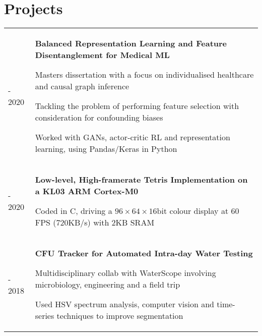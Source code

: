 \documentclass[letterpaper, 10pt]{article}
\begin{document}
\section*{Projects}
\begin{tabularx}{\linewidth}{>{\raggedleft}p{2.2cm}|p{6.45cm} X}
2019 - 2020 & \multicolumn{2}{p{\linegoal}}{
    \vspace{-2.9mm}\textbf{Balanced Representation Learning and Feature Disentanglement for Medical ML}
    \begin{compact}
        \item Masters dissertation with a focus on individualised healthcare and causal graph inference
        \item Tackling the problem of performing feature selection with consideration for confounding biases
        \item Worked with GANs, actor-critic RL and representation learning, using Pandas/Keras in Python
        \vspace{-.5\baselineskip}
    \end{compact}
}\\
2019 - 2020 & \multicolumn{2}{p{\linegoal}}{
\vspace{-2.9mm}\textbf{Low-level, High-framerate Tetris Implementation on a KL03 ARM Cortex-M0}
\begin{compact}
   \item Coded in C, driving a $96\times64\times16\mathrm{bit}$ colour display at 60 FPS (720KB/s) with 2KB SRAM
   \vspace{-.5\baselineskip}
\end{compact}
}\\
2017 - 2018 & \multicolumn{2}{p{\linegoal}}{
	\vspace{-2.9mm}\textbf{CFU Tracker for Automated Intra-day Water Testing}
	\begin{compact}
		\item Multidisciplinary collab with WaterScope involving microbiology, engineering and a field trip
		\item Used HSV spectrum analysis, computer vision and time-series techniques to improve segmentation
		\vspace{-2\baselineskip}
	\end{compact}
}\\
\end{tabularx}
\end{document}
